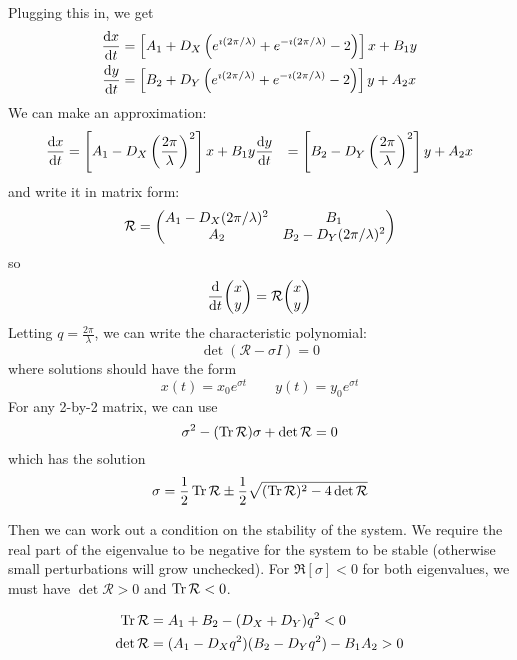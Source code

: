 \documentclass[a4paper,twoside,master.tex]{subfiles}
\begin{document}
Plugging this in, we get
\begin{align}
        \dv{x}{t} &= \left[ A_1 + D_X \left( e^{\imath (2 \pi / \lambda)} + e^{-\imath (2 \pi / \lambda)} - 2 \right) \right]x + B_1 y \\
        \dv{y}{t} &= \left[ B_2 + D_Y \left( e^{\imath (2 \pi / \lambda)} + e^{-\imath (2 \pi / \lambda)} - 2 \right) \right]y + A_2 x
\end{align}
We can make an approximation:
\begin{align}
    \dv{x}{t} &= \left[ A_1 - D_X \left( \frac{2 \pi}{\lambda} \right)^2 \right]x + B_1 y
    \dv{y}{t} &= \left[ B_2 - D_Y \left( \frac{2 \pi}{\lambda} \right)^2 \right]y + A_2 x
\end{align}
and write it in matrix form:
\begin{equation}
    \mathcal{R} = \mqty(A_1 - D_X(2 \pi / \lambda)^2 & B_1 \\ A_2 & B_2 - D_Y(2 \pi / \lambda)^2)
\end{equation}
so
\begin{equation}
    \dv{t} \mqty(x\\y) = \mathcal{R} \mqty(x\\y)
\end{equation}
Letting $ q = \frac{2 \pi}{\lambda} $, we can write the characteristic polynomial:
\begin{equation}
    \det(\mathcal{R} - \sigma I) = 0
\end{equation}
where solutions should have the form
\begin{equation}
    x(t) = x_0 e^{\sigma t} \qquad y(t) = y_0 e^{\sigma t}
\end{equation}
For any 2-by-2 matrix, we can use
\begin{equation}
    \sigma^2 - (\Tr \mathcal{R}) \sigma + \det\mathcal{R} = 0
\end{equation}
which has the solution
\begin{equation}
    \sigma = \frac{1}{2} \Tr \mathcal{R} \pm \frac{1}{2} \sqrt{(\Tr \mathcal{R})^2 - 4 \det\mathcal{R}} 
\end{equation}

Then we can work out a condition on the stability of the system. We require the real part of the eigenvalue to be negative for the system to be stable (otherwise small perturbations will grow unchecked). For $ \Re[\sigma] < 0 $ for both eigenvalues, we must have $ \det\mathcal{R} > 0 $ and $ \Tr \mathcal{R} < 0 $.

\begin{align}
    \Tr\mathcal{R} &= A_1 + B_2 - (D_X + D_Y)q^2 < 0 \\
    \det\mathcal{R} &= (A_1 - D_X q^2)(B_2 - D_Y q^2) - B_1 A_2 > 0
\end{align}
\end{document}
